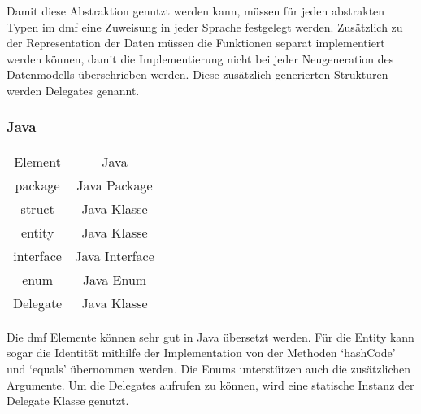 \documentclass[./einleitung.tex]{subfiles}
\begin{document}
    Damit diese Abstraktion genutzt werden kann, müssen für jeden abstrakten Typen im \acrshort{dmf} eine Zuweisung in jeder Sprache festgelegt werden.
    Zusätzlich zu der Representation der Daten müssen die Funktionen separat implementiert werden können, damit die Implementierung nicht bei jeder Neugeneration des Datenmodells überschrieben werden.
    Diese zusätzlich generierten Strukturen werden Delegates genannt.

    \subsubsection{Java}
    \begin{center}
        \begin{tabular}{| c || c |}
            \hline
            Element   & Java           \\
            \hhline{|=||=|}
            package   & Java Package   \\
            \hline
            struct    & Java Klasse    \\
            \hline
            entity    & Java Klasse    \\
            \hline
            interface & Java Interface \\
            \hline
            enum      & Java Enum      \\
            \hline
            Delegate  & Java Klasse    \\
            \hline
        \end{tabular}
    \end{center}
    Die \acrshort{dmf} Elemente können sehr gut in Java übersetzt werden.
    Für die Entity kann sogar die Identität mithilfe der Implementation von der Methoden `hashCode' und `equals' übernommen werden.
    Die Enums unterstützen auch die zusätzlichen Argumente.
    Um die Delegates aufrufen zu können, wird eine statische Instanz der Delegate Klasse genutzt.
\end{document}
